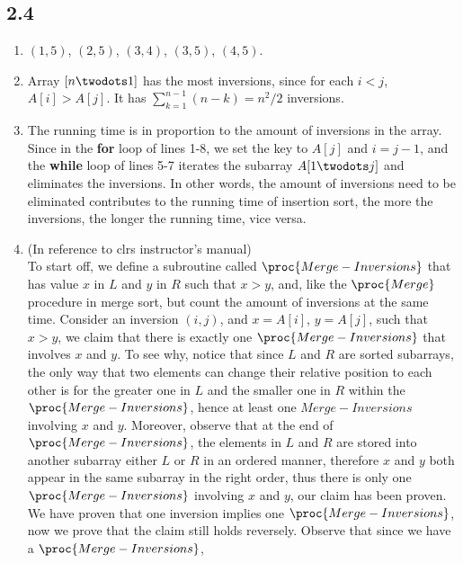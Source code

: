 \subsection{2.4}
\begin{enumerate}[leftmargin=*]
    \item $(1,5)$, $(2,5)$, $(3,4)$, $(3,5)$, $(4,5)$.
    \item Array $[n\twodots 1]$ has the most inversions, since for each $i<j$,
        $A[i]>A[j]$. It has $\sum_{k=1}^{n-1}(n-k)=n^2/2$ inversions.
    \item The running time is in proportion to the amount of inversions in the
        array. Since in the \textbf{for} loop of lines 1-8, we set the key
        to $A[j]$ and $i=j-1$, and the \textbf{while} loop of lines 5-7 iterates
        the subarray $A[1\twodots j]$ and eliminates the inversions. In other
        words, the amount of inversions need to be eliminated contributes to
        the running time of insertion sort, the more the inversions, the longer
        the running time, vice versa.
    \item (In reference to clrs instructor's manual) \\
        To start off, we define a subroutine called $\proc{Merge-Inversions}$
        that has value $x$ in $L$ and $y$ in $R$ such that $x>y$, and,
        like the $\proc{Merge}$ procedure in merge sort, but count the amount
        of inversions at the same time. Consider an inversion $(i,j)$, and
        $x=A[i]$, $y=A[j]$, such that $x>y$, we claim that there is exactly
        one $\proc{Merge-Inversions}$ that involves $x$ and $y$. To see why,
        notice that since $L$ and $R$ are sorted subarrays, the only way that
        two elements can change their relative position to each other is for
        the greater one in $L$ and the smaller one in $R$ within the
        $\proc{Merge-Inversions}$, hence at least one $Merge-Inversions$
        involving $x$ and $y$. Moreover, observe that at the end of
        $\proc{Merge-Inversions}$, the elements in $L$ and $R$ are stored into
        another subarray either $L$ or $R$ in an ordered manner, therefore $x$
        and $y$ both appear in the same subarray in the right order, thus there
        is only one $\proc{Merge-Inversions}$ involving $x$ and $y$, our claim
        has been proven. \\
        We have proven that one inversion implies one
        $\proc{Merge-Inversions}$, now we prove that the claim still holds
        reversely. Observe that since we have a $\proc{Merge-Inversions}$,

\end{enumerate}
